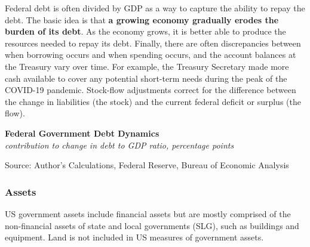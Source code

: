 \documentclass{report}
\makeatletter
\newcommand{\tbllink}[1]{\href{https://raw.githubusercontent.com/bdecon/US-chartbook/master/chartbook/data/#1}{\faTable}}
\newcommand*\short[1]{\expandafter\@gobbletwo\number\numexpr#1\relax}
\newcommand{\ctsbar}[5]{
		\addplot[ybar stacked, bar width=#5, draw opacity=0, fill=#1] 
			table [x=#2, y=#3, col sep=comma]{#4};}
\newcommand{\dateaxisticks}{
		date coordinates in=x, axis line style={draw=none},
		xmax={2024-01-31},
		max space between ticks=40,	    
		xtick={{1990-01-01}, {1992-01-01}, {1994-01-01}, 
			{1996-01-01}, {1998-01-01}, {2000-01-01}, 
			{2002-01-01}, {2004-01-01}, {2006-01-01},
			{2008-01-01}, {2010-01-01}, {2012-01-01}, {2014-01-01},
		    {2016-01-01}, {2018-01-01}, {2020-01-01}, {2022-01-01}, 
		    {2024-01-01}, {2026-01-01}},
		minor xtick={{1989-01-01}, {1991-01-01}, {1993-01-01},
			{1995-01-01}, {1997-01-01}, {1999-01-01}, 
			{2001-01-01}, {2003-01-01}, {2005-01-01}, {2007-01-01},
		    {2009-01-01}, {2011-01-01}, {2013-01-01}, {2015-01-01},
		    {2017-01-01}, {2019-01-01}, {2021-01-01}, {2023-01-01}, 
		    {2025-01-01}, {2027-01-01}},
		enlarge y limits={0.06}, enlarge x limits={0.01},
		xticklabel style={align=center, yshift=-2pt}, tick label style={inner sep=0pt},
		}
\newcommand{\bbar}[2]{extra #1 ticks = {{#2}}, extra #1 tick labels = ,
		extra #1 tick style = {grid=major, grid style={thick, black!25}},}
\newcommand{\rbars}{
		\fill[color=black!10] (axis cs:{1990-07-01},\pgfkeysvalueof{/pgfplots/ymin})
			rectangle (axis cs:{1991-03-01}, \pgfkeysvalueof{/pgfplots/ymax});
		\fill[color=black!10] (axis cs:{2007-12-01},\pgfkeysvalueof{/pgfplots/ymin})
			rectangle (axis cs:{2009-07-01}, \pgfkeysvalueof{/pgfplots/ymax});
		\fill[color=black!10] (axis cs:{2001-03-01},\pgfkeysvalueof{/pgfplots/ymin})
			rectangle (axis cs:{2001-11-01}, \pgfkeysvalueof{/pgfplots/ymax});
		\fill[color=black!10] (axis cs:{2020-02-01},\pgfkeysvalueof{/pgfplots/ymin})
			rectangle (axis cs:{2020-05-01}, \pgfkeysvalueof{/pgfplots/ymax});}
\makeatother
\begin{document}
{\begin{minipage}{1.0\textwidth}
Federal debt is often divided by GDP as a way to capture the ability to repay the debt. The basic idea is that \textbf{a growing economy gradually erodes the burden of its debt}. As the economy grows, it is better able to produce the resources needed to repay its debt. Finally, there are often discrepancies between when borrowing occurs and when spending occurs, and the account balances at the Treasury vary over time. For example, the Treasury Secretary made more cash available to cover any potential short-term needs during the peak of the COVID-19 pandemic. Stock-flow adjustments correct for the difference between the change in liabilities (the stock) and the current federal deficit or surplus (the flow).


\vspace{2mm}

\normalsize \textbf{Federal Government Debt Dynamics}\\
\footnotesize{\textit{contribution to change in debt to GDP ratio, percentage points}}
\vspace{5.6cm}

\hspace{3mm} 

\footnotesize{Source: Author's Calculations, Federal Reserve, Bureau of Economic Analysis} \hfill \tbllink{debt_dynamics.csv} 
\end{minipage}
\newpage
\begin{minipage}{1.0\textwidth}
\subsubsection*{Assets}  
\small US government assets include financial assets but are mostly comprised of the non-financial assets of state and local governments (SLG), such as buildings and equipment. Land is not included in US measures of government assets. 


\end{minipage}}
\end{document}
